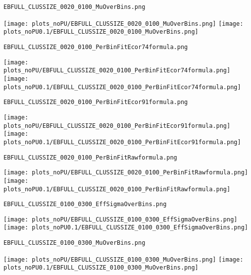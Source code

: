 \begin{frame}[fragile]
\begin{verbatim}
EBFULL_CLUSSIZE_0020_0100_MuOverBins.png
\end{verbatim}
\texttt{[image: plots\_noPU/EBFULL\_CLUSSIZE\_0020\_0100\_MuOverBins.png]}
\texttt{[image: plots\_noPU0.1/EBFULL\_CLUSSIZE\_0020\_0100\_MuOverBins.png]}
\end{frame}
\begin{frame}[fragile]
\begin{verbatim}
EBFULL_CLUSSIZE_0020_0100_PerBinFitEcor74formula.png
\end{verbatim}
\texttt{[image: plots\_noPU/EBFULL\_CLUSSIZE\_0020\_0100\_PerBinFitEcor74formula.png]}
\texttt{[image: plots\_noPU0.1/EBFULL\_CLUSSIZE\_0020\_0100\_PerBinFitEcor74formula.png]}
\end{frame}
\begin{frame}[fragile]
\begin{verbatim}
EBFULL_CLUSSIZE_0020_0100_PerBinFitEcor91formula.png
\end{verbatim}
\texttt{[image: plots\_noPU/EBFULL\_CLUSSIZE\_0020\_0100\_PerBinFitEcor91formula.png]}
\texttt{[image: plots\_noPU0.1/EBFULL\_CLUSSIZE\_0020\_0100\_PerBinFitEcor91formula.png]}
\end{frame}
\begin{frame}[fragile]
\begin{verbatim}
EBFULL_CLUSSIZE_0020_0100_PerBinFitRawformula.png
\end{verbatim}
\texttt{[image: plots\_noPU/EBFULL\_CLUSSIZE\_0020\_0100\_PerBinFitRawformula.png]}
\texttt{[image: plots\_noPU0.1/EBFULL\_CLUSSIZE\_0020\_0100\_PerBinFitRawformula.png]}
\end{frame}
\begin{frame}[fragile]
\begin{verbatim}
EBFULL_CLUSSIZE_0100_0300_EffSigmaOverBins.png
\end{verbatim}
\texttt{[image: plots\_noPU/EBFULL\_CLUSSIZE\_0100\_0300\_EffSigmaOverBins.png]}
\texttt{[image: plots\_noPU0.1/EBFULL\_CLUSSIZE\_0100\_0300\_EffSigmaOverBins.png]}
\end{frame}
\begin{frame}[fragile]
\begin{verbatim}
EBFULL_CLUSSIZE_0100_0300_MuOverBins.png
\end{verbatim}
\texttt{[image: plots\_noPU/EBFULL\_CLUSSIZE\_0100\_0300\_MuOverBins.png]}
\texttt{[image: plots\_noPU0.1/EBFULL\_CLUSSIZE\_0100\_0300\_MuOverBins.png]}
\end{frame}
